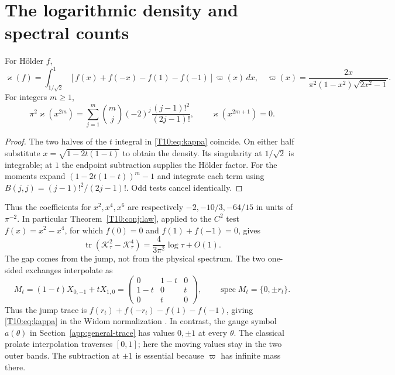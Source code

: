 \section{The logarithmic density and spectral counts}\label{v6:sec:density}
\begin{proposition}\label{T10:prop:density}
For H\"older $f$,
\begin{equation}\label{T10:eq:density}
 \varkappa(f)=\int_{1/\sqrt2}^1
 [f(x)+f(-x)-f(1)-f(-1)]\varpi(x)\,dx,
 \quad
 \varpi(x)=\frac{2x}{\pi^2(1-x^2)\sqrt{2x^2-1}}.
\end{equation}
For integers $m\ge1$,
\begin{equation}\label{T10:eq:moments}
 \pi^2\varkappa(x^{2m})=
 \sum_{j=1}^m \binom{m}{j}(-2)^j\frac{(j-1)!^2}{(2j-1)!},
 \qquad \varkappa(x^{2m+1})=0.
\end{equation}
\end{proposition}
\begin{proof}
The two halves of the $t$ integral in \eqref{T10:eq:kappa} coincide.
On either half substitute $x=\sqrt{1-2t(1-t)}$ to obtain the density.
Its singularity at $1/\sqrt2$ is integrable; at $1$ the endpoint
subtraction supplies the H\"older factor.  For the moments expand
$(1-2t(1-t))^m-1$ and integrate each term using
$B(j,j)=(j-1)!^2/(2j-1)!$.  Odd tests cancel identically.
\end{proof}
Thus the coefficients for $x^2,x^4,x^6$ are respectively
$-2,-10/3,-64/15$ in units of $\pi^{-2}$.  In particular
Theorem~\ref{T10:conj:law}, applied to the $C^2$ test $f(x)=x^2-x^4$, for
which $f(0)=0$ and $f(1)+f(-1)=0$, gives
\begin{equation}\label{short:eq:quartic}
 \operatorname{tr}(\mathcal K_\tau^2-\mathcal K_\tau^4)
 =\frac4{3\pi^2}\log\tau+O(1).
\end{equation}
The gap comes from the jump, not from the physical spectrum. The two
one-sided exchanges interpolate as
\[
 M_t=(1-t)X_{0,-1}+tX_{1,0}
 =\begin{pmatrix}0&1-t&0\\1-t&0&t\\0&t&0\end{pmatrix},
 \qquad\operatorname{spec}M_t=\{0,\pm r_t\}.
\]
Thus the jump trace is $f(r_t)+f(-r_t)-f(1)-f(-1)$, giving
\eqref{T10:eq:kappa} in the Widom normalization \cite{Widom1982}.
In contrast, the gauge symbol $a(\theta)$ in
Section~\ref{app:general-trace} has values $0,\pm1$ at every $\theta$.
The classical prolate interpolation traverses $[0,1]$; here the moving
values stay in the two outer bands. The subtraction at $\pm1$ is essential
because $\varpi$ has infinite mass there.

